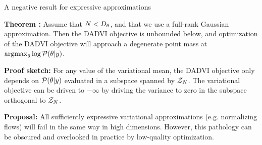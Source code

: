     
    \begin{frame}{A negative result for expressive approximations}
    
    \noindent
    \textbf{Theorem \citep{giordano:2023:dadvi}:}  Assume that $N < {D_{\theta}}$,
    and that we use a full-rank Gaussian approximation.  Then the DADVI objective is
    unbounded below, and optimization of the DADVI objective will approach a
    degenerate point mass at $\operatorname*{\mathrm{argmax}}_\theta \log \mathcal{P}(\theta \vert y)$.
    
    \pause
    
    \vspace{2em}
    \noindent
    \textbf{Proof sketch: }For any value of the variational
    mean, the DADVI objective only depends on $\mathcal{P}(\theta \vert y)$ evaluated
    in a subspace spanned by $\mathcal{Z}_{N}$.  The variational objective can be driven to 
    $-\infty$ by driving the variance to zero in the subspace orthogonal to $\mathcal{Z}_{N}$.
    
    \pause
    
    \vspace{2em}
    \noindent
    \textbf{Proposal: }  All sufficiently expressive variational approximations
    (e.g. normalizing flows) will fail in the same way in high dimensions. However,
    this pathology can be obscured and overlooked in practice by low-quality
    optimization.
    
    
    
    \end{frame}
    